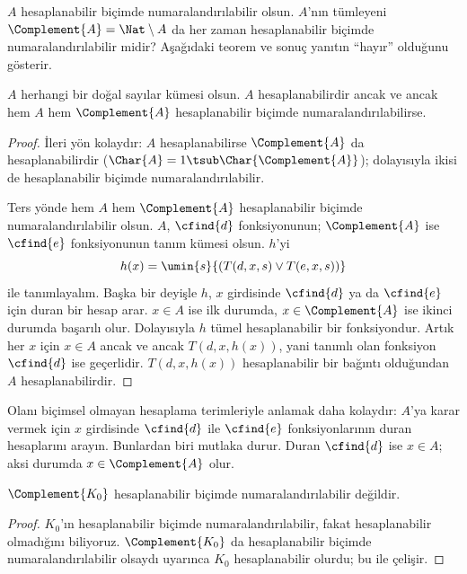 \documentclass[../../../include/open-logic-section]{subfiles}
\begin{document}

$A$ hesaplanabilir biçimde numaralandırılabilir olsun. $A$'nın tümleyeni
$\Complement{A}=\Nat\setminus A$ da her zaman hesaplanabilir biçimde
numaralandırılabilir midir? Aşağıdaki teorem ve sonuç yanıtın ``hayır''
olduğunu gösterir.

\begin{thm}
$A$ herhangi bir doğal sayılar kümesi olsun. $A$ hesaplanabilirdir ancak ve
ancak hem $A$ hem $\Complement{A}$ hesaplanabilir biçimde
numaralandırılabilirse.
\end{thm}

\begin{proof}
İleri yön kolaydır: $A$ hesaplanabilirse $\Complement{A}$ da
hesaplanabilirdir ($\Char{A}=1\tsub\Char{\Complement{A}}$); dolayısıyla ikisi
de hesaplanabilir biçimde numaralandırılabilir.

Ters yönde hem $A$ hem $\Complement{A}$ hesaplanabilir biçimde
numaralandırılabilir olsun. $A$, $\cfind{d}$ fonksiyonunun;
$\Complement{A}$ ise $\cfind{e}$ fonksiyonunun tanım kümesi olsun. $h$'yi
\[
  h(x)=\umin{s}{(T(d,x,s)\lor T(e,x,s))}
\]
ile tanımlayalım. Başka bir deyişle $h$, $x$ girdisinde $\cfind{d}$ ya da
$\cfind{e}$ için duran bir hesap arar. $x\in A$ ise ilk durumda,
$x\in\Complement{A}$ ise ikinci durumda başarılı olur. Dolayısıyla $h$ tümel
hesaplanabilir bir fonksiyondur. Artık her $x$ için $x\in A$ ancak ve ancak
$T(d,x,h(x))$, yani tanımlı olan fonksiyon $\cfind{d}$ ise geçerlidir.
$T(d,x,h(x))$ hesaplanabilir bir bağıntı olduğundan $A$ hesaplanabilirdir.
\end{proof}

\begin{explain}
Olanı biçimsel olmayan hesaplama terimleriyle anlamak daha kolaydır: $A$'ya
karar vermek için $x$ girdisinde $\cfind{d}$ ile $\cfind{e}$ fonksiyonlarının
duran hesaplarını arayın. Bunlardan biri mutlaka durur. Duran $\cfind{d}$ ise
$x\in A$; aksi durumda $x\in\Complement{A}$ olur.
\end{explain}

\begin{cor}
$\Complement{K_0}$ hesaplanabilir biçimde numaralandırılabilir değildir.
\end{cor}

\begin{proof}
$K_0$'ın hesaplanabilir biçimde numaralandırılabilir, fakat hesaplanabilir
olmadığını biliyoruz. $\Complement{K_0}$ da hesaplanabilir biçimde
numaralandırılabilir olsaydı  uyarınca $K_0$
hesaplanabilir olurdu; bu  ile çelişir.
\end{proof}
\end{document}
